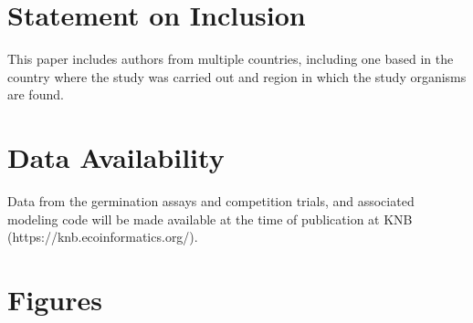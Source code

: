 \documentclass{article}[11pt]
\begin{document}
\section*{Statement on Inclusion}
This paper includes authors from multiple countries, including one based in the country where the study was carried out and region in which the study organisms are found.

\section*{Data Availability}
Data from the germination assays and competition trials, and associated modeling code will be made available at the time of publication at KNB (https://knb.ecoinformatics.org/).


\section*{Figures}
\end{document}
